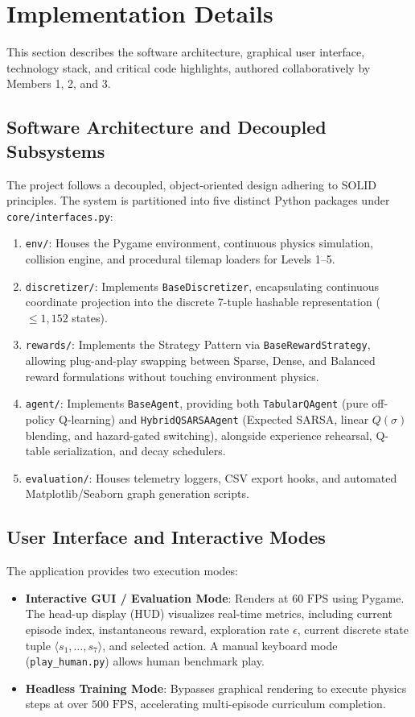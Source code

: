 \section{Implementation Details}
\label{sec:impl}

This section describes the software architecture, graphical user interface, technology stack, and critical code highlights, authored collaboratively by Members 1, 2, and 3.

\subsection{Software Architecture and Decoupled Subsystems}
The project follows a decoupled, object-oriented design adhering to SOLID principles. The system is partitioned into five distinct Python packages under \texttt{core/interfaces.py}:
\begin{enumerate}
    \item \texttt{env/}: Houses the Pygame environment, continuous physics simulation, collision engine, and procedural tilemap loaders for Levels 1--5.
    \item \texttt{discretizer/}: Implements \texttt{BaseDiscretizer}, encapsulating continuous coordinate projection into the discrete 7-tuple hashable representation ($\le 1{,}152$ states).
    \item \texttt{rewards/}: Implements the Strategy Pattern via \texttt{BaseRewardStrategy}, allowing plug-and-play swapping between Sparse, Dense, and Balanced reward formulations without touching environment physics.
    \item \texttt{agent/}: Implements \texttt{BaseAgent}, providing both \texttt{TabularQAgent} (pure off-policy Q-learning) and \texttt{HybridQSARSAAgent} (Expected SARSA, linear $Q(\sigma)$ blending, and hazard-gated switching), alongside experience rehearsal, Q-table serialization, and decay schedulers.
    \item \texttt{evaluation/}: Houses telemetry loggers, CSV export hooks, and automated Matplotlib/Seaborn graph generation scripts.
\end{enumerate}

\subsection{User Interface and Interactive Modes}
The application provides two execution modes:
\begin{itemize}
    \item \textbf{Interactive GUI / Evaluation Mode}: Renders at $60\text{ FPS}$ using Pygame. The head-up display (HUD) visualizes real-time metrics, including current episode index, instantaneous reward, exploration rate $\epsilon$, current discrete state tuple $\langle s_1, \dots, s_7 \rangle$, and selected action. A manual keyboard mode (\texttt{play\_human.py}) allows human benchmark play.
    \item \textbf{Headless Training Mode}: Bypasses graphical rendering to execute physics steps at over $500\text{ FPS}$, accelerating multi-episode curriculum completion.
\end{itemize}

